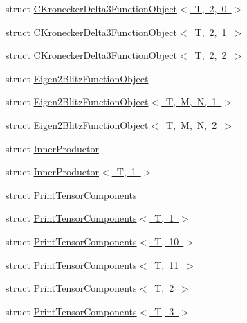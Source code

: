 \begin{DoxyCompactItemize}
\item 
struct \mbox{\hyperlink{structmpc_1_1utilities_1_1_c_kronecker_delta3_function_object_3_01_t_00_012_00_010_01_4}{C\+Kronecker\+Delta3\+Function\+Object$<$ T, 2, 0 $>$}}
\item 
struct \mbox{\hyperlink{structmpc_1_1utilities_1_1_c_kronecker_delta3_function_object_3_01_t_00_012_00_011_01_4}{C\+Kronecker\+Delta3\+Function\+Object$<$ T, 2, 1 $>$}}
\item 
struct \mbox{\hyperlink{structmpc_1_1utilities_1_1_c_kronecker_delta3_function_object_3_01_t_00_012_00_012_01_4}{C\+Kronecker\+Delta3\+Function\+Object$<$ T, 2, 2 $>$}}
\item 
struct \mbox{\hyperlink{structmpc_1_1utilities_1_1_eigen2_blitz_function_object}{Eigen2\+Blitz\+Function\+Object}}
\item 
struct \mbox{\hyperlink{structmpc_1_1utilities_1_1_eigen2_blitz_function_object_3_01_t_00_01_m_00_01_n_00_011_01_4}{Eigen2\+Blitz\+Function\+Object$<$ T, M, N, 1 $>$}}
\item 
struct \mbox{\hyperlink{structmpc_1_1utilities_1_1_eigen2_blitz_function_object_3_01_t_00_01_m_00_01_n_00_012_01_4}{Eigen2\+Blitz\+Function\+Object$<$ T, M, N, 2 $>$}}
\item 
struct \mbox{\hyperlink{structmpc_1_1utilities_1_1_inner_productor}{Inner\+Productor}}
\item 
struct \mbox{\hyperlink{structmpc_1_1utilities_1_1_inner_productor_3_01_t_00_011_01_4}{Inner\+Productor$<$ T, 1 $>$}}
\item 
struct \mbox{\hyperlink{structmpc_1_1utilities_1_1_print_tensor_components}{Print\+Tensor\+Components}}
\item 
struct \mbox{\hyperlink{structmpc_1_1utilities_1_1_print_tensor_components_3_01_t_00_011_01_4}{Print\+Tensor\+Components$<$ T, 1 $>$}}
\item 
struct \mbox{\hyperlink{structmpc_1_1utilities_1_1_print_tensor_components_3_01_t_00_0110_01_4}{Print\+Tensor\+Components$<$ T, 10 $>$}}
\item 
struct \mbox{\hyperlink{structmpc_1_1utilities_1_1_print_tensor_components_3_01_t_00_0111_01_4}{Print\+Tensor\+Components$<$ T, 11 $>$}}
\item 
struct \mbox{\hyperlink{structmpc_1_1utilities_1_1_print_tensor_components_3_01_t_00_012_01_4}{Print\+Tensor\+Components$<$ T, 2 $>$}}
\item 
struct \mbox{\hyperlink{structmpc_1_1utilities_1_1_print_tensor_components_3_01_t_00_013_01_4}{Print\+Tensor\+Components$<$ T, 3 $>$}}

\end{DoxyCompactItemize}
